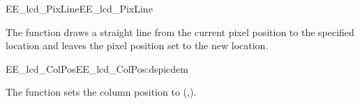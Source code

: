 \begin{function_nopb2}{EE\_lcd\_PixLine}{EE_lcd_PixLine}
  
  \begin{fundescription}
    The function draws a straight line from the current pixel position
    to the specified location and leaves the pixel position set to the
    new location.
  \end{fundescription}
  
  \begin{funparameters}
  \end{funparameters}
  
  
\end{function_nopb2}

\begin{function_nopb2}{EE\_lcd\_ColPos}{EE_lcd_ColPos:dspicdem}
  
  \begin{fundescription}
    The function sets the column position to (,).
  \end{fundescription}
  
  \begin{funparameters}
  \end{funparameters}
  
  
\end{function_nopb2}


